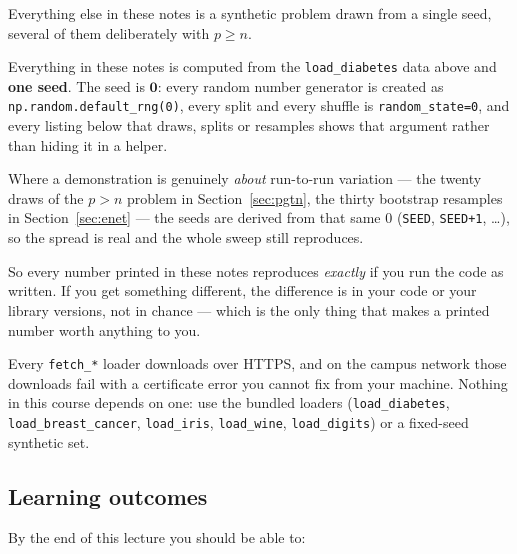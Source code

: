 \documentclass[11pt]{article}
\begin{document}
Everything else in these notes is a synthetic problem drawn from a single
seed, several of them deliberately with $p \ge n$.

\begin{keyidea}
Everything in these notes is computed from the \texttt{load\_diabetes} data
above and \textbf{one seed}. The seed is $\mathbf{0}$: every random number
generator is created as \texttt{np.random.default\_rng(0)}, every split and
every shuffle is \texttt{random\_state=0}, and every listing below that
draws, splits or resamples shows that argument rather than hiding it in a
helper.

Where a demonstration is genuinely \emph{about} run-to-run variation --- the
twenty draws of the $p>n$ problem in Section~\ref{sec:pgtn}, the thirty
bootstrap resamples in Section~\ref{sec:enet} --- the seeds are derived from
that same $0$ (\texttt{SEED}, \texttt{SEED+1}, \dots), so the spread is real
and the whole sweep still reproduces.

So every number printed in these notes reproduces \emph{exactly} if you run
the code as written. If you get something different, the difference is in your
code or your library versions, not in chance --- which is the only thing that
makes a printed number worth anything to you.
\end{keyidea}

\begin{caution}
Every \texttt{fetch\_*} loader downloads over HTTPS, and on the campus network
those downloads fail with a certificate error you cannot fix from your machine.
Nothing in this course depends on one: use the bundled loaders
(\texttt{load\_diabetes}, \texttt{load\_breast\_cancer}, \texttt{load\_iris},
\texttt{load\_wine}, \texttt{load\_digits}) or a fixed-seed synthetic set.
\end{caution}

\subsection{Learning outcomes}

By the end of this lecture you should be able to:
\end{document}
